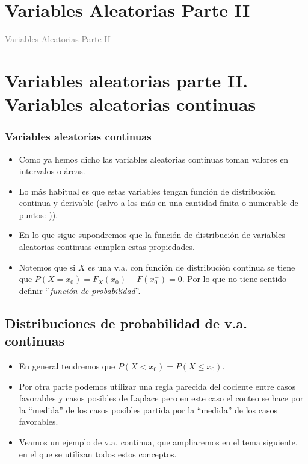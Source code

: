 \documentclass[handout]{beamer}\usepackage[]{graphicx}\usepackage[]{color}
\title[\red{Matemáticas III GINF}]{}
\author[]{R. Alberich}
\date{}
\newcommand{\gray}[1]{\textcolor{gray}{#1}}
\renewcommand{\leq}{\leqslant}
\theoremstyle{plain}
\theoremstyle{definition}
\begin{document}
\beamertemplatedotitem

\lstset{breaklines=true}
\lstset{basicstyle=\ttfamily}


\section{Variables Aleatorias Parte II}

\begin{frame}
\vfill
\begin{center}
\gray{\LARGE Variables Aleatorias Parte II}
\end{center}
\vfill
\end{frame}
\section{Variables aleatorias parte  II. Variables aleatorias continuas}


\begin{frame}
\frametitle{Variables aleatorias continuas}


\begin{itemize}
\item Como ya hemos dicho las variables aleatorias continuas toman valores en
intervalos o áreas.
\item Lo más habitual es que estas variables tengan función de distribución continua y
derivable (salvo  a los más en una cantidad finita o numerable de puntos:-)).
\item En lo que sigue supondremos que la función de distribución de variables
aleatorias continuas cumplen estas propiedades.
\item Notemos que si $X$ es una v.a. con función de distribución continua se tiene que
$P(X=x_{0})=F_X(x_0)-F(x_0^{-})=0$. Por lo que no tiene sentido definir `'\textit{función de
probabilidad}''.
\end{itemize}
\end{frame}

\subsection{Distribuciones de probabilidad de v.a. continuas}

\begin{frame}
\begin{itemize}
\item En general tendremos que $P(X<x_0)=P(X\leq x_0)$.
\item Por otra parte podemos utilizar una regla parecida del
cociente entre casos favorables y casos posibles de Laplace  pero en
este caso el conteo se hace por la ``medida''  de los casos
posibles partida por la ``medida'' de los casos favorables.
\item Veamos un ejemplo de v.a. continua, que ampliaremos en el
tema siguiente, en el que se utilizan todos estos conceptos.
\end{itemize}
\end{frame}
\end{document}
